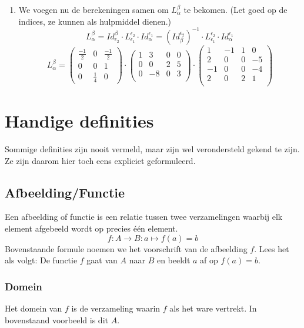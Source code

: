 \documentclass[lineaire_algebra_oplossingen.tex]{subfiles}
\begin{document}
\begin{enumerate}
\item
We voegen nu de berekeningen samen om $L_{\alpha}^{\beta}$ te bekomen. (Let goed op de indices, ze kunnen als hulpmiddel dienen.)
\[
L_{\alpha}^{\beta}
= Id_{\epsilon_2}^{\beta} \cdot L_{\epsilon_1}^{\epsilon_2} \cdot Id_{\alpha}^{\epsilon_1} 
= (Id_{\beta}^{\epsilon_2})^{-1} \cdot L_{\epsilon_1}^{\epsilon_2} \cdot Id_{\alpha}^{\epsilon_1} 
\]
\[
L_{\alpha}^{\beta} = 
\begin{pmatrix}
\frac{-1}{2} & 0 & \frac{-1}{2}\\
0 & 0 & 1\\
0 & \frac{1}{4} & 0
\end{pmatrix}
\cdot
\begin{pmatrix}
1 & 3 & 0 & 0\\
0 & 0 & 2 & 5\\
0 & -8 &0 & 3\\
\end{pmatrix}
\cdot 
\begin{pmatrix}
1 & -1 & 1 & 0\\
2 & 0 & 0 & -5\\
-1 & 0 & 0 & -4\\
2 & 0 & 2 & 1\\
\end{pmatrix}
\]


\end{enumerate}




\chapter{Handige definities}
Sommige definities zijn nooit vermeld, maar zijn wel verondersteld gekend te zijn. Ze zijn daarom hier toch eens expliciet geformuleerd.

\section{Afbeelding/Functie}
\label{afbeelding}
Een afbeelding of functie is een relatie tussen twee verzamelingen waarbij elk element afgebeeld wordt op precies \'e\'en element.
\[
f : A \rightarrow B : a \mapsto f(a)=b
\]
Bovenstaande formule noemen we het voorschrift van de afbeelding $f$.
Lees het als volgt:
De functie $f$ gaat van $A$ naar $B$ en beeldt $a$ af op $f(a)=b$.


\subsection{Domein}
\label{domain}
Het domein van $f$ is de verzameling waarin $f$ als het ware vertrekt. In bovenstaand voorbeeld is dit $A$.
\end{document}
